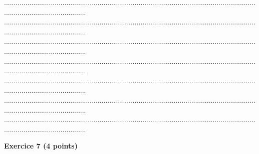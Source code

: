 \documentclass{article}
\begin{document}
\begin{footnotesize}
\begin{enumerate}
    ...........................................................................................................................................................................\newline
    ...........................................................................................................................................................................\newline
    ...........................................................................................................................................................................\newline
    ...........................................................................................................................................................................\newline
    ...........................................................................................................................................................................\newline
    ...........................................................................................................................................................................\newline
    ...........................................................................................................................................................................\newline\newline
\end{enumerate}
\end{footnotesize}
\noindent\textbf{Exercice 7 (4 points)}\newline
\end{document}
